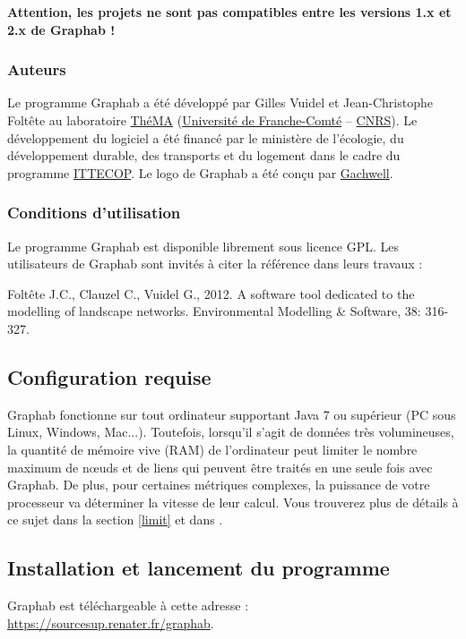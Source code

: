 \documentclass{article}
\begin{document}
\textbf{Attention, les projets ne sont pas compatibles entre les versions 1.x et 2.x de Graphab !}

\subsubsection{Auteurs}
Le programme Graphab a été développé par Gilles Vuidel et Jean-Christophe Foltête au laboratoire \href{http://thema.univ-fcomte.fr}{ThéMA} (\href{http://www.univ-fcomte.fr}{Université de Franche-Comté} – \href{http://www.cnrs.fr}{CNRS}). Le développement du logiciel a été financé par le ministère de l'écologie, du développement durable, des transports et du logement dans le cadre du programme \href{http://www.ittecop.fr/}{ITTECOP}. Le logo de Graphab a été conçu par \href{http://www.gachwell.com/}{Gachwell}. 

\subsubsection{Conditions d’utilisation}
Le programme Graphab est disponible librement sous licence GPL. Les utilisateurs de Graphab sont invités à citer la référence \cite{2012_graphab_EMS} dans leurs travaux :

Foltête J.C., Clauzel C., Vuidel G., 2012. A software tool dedicated to the modelling of landscape networks. Environmental Modelling \& Software, 38: 316-327.


\subsection{Configuration requise}

Graphab fonctionne sur tout ordinateur supportant Java 7 ou supérieur (PC sous Linux, Windows, Mac...). Toutefois, lorsqu'il s'agit de données très volumineuses, la quantité de mémoire vive (RAM) de l’ordinateur peut limiter le nombre maximum de nœuds et de liens qui peuvent être traités en une seule fois avec Graphab. De plus, pour certaines métriques complexes, la puissance de votre processeur va déterminer la vitesse de leur calcul. Vous trouverez plus de détails à ce sujet dans la section \ref{limit} et dans \cite{2012_graphab_EMS}.

\subsection{Installation et lancement du programme}

Graphab est téléchargeable à cette adresse : \url{https://sourcesup.renater.fr/graphab}.
\end{document}
